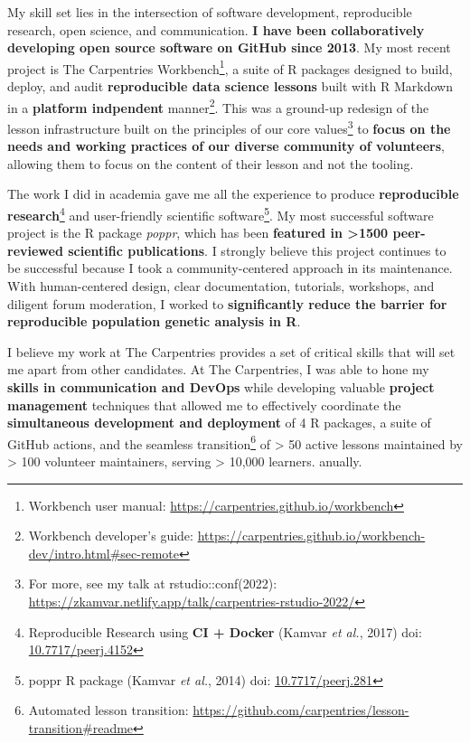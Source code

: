 My skill set lies in the intersection of software development, reproducible
research, open science, and communication. 
\textbf{I have been collaboratively developing open source software on GitHub
since 2013}.
My most recent project is The Carpentries Workbench\footnote{Workbench user manual: \url{https://carpentries.github.io/workbench}}, 
a suite of R packages designed to build, deploy, and audit \textbf{reproducible
data science lessons} built with R Markdown in a \textbf{platform indpendent} manner\footnote{Workbench developer's guide: \url{https://carpentries.github.io/workbench-dev/intro.html\#sec-remote}}.
This was a ground-up redesign of the lesson infrastructure built on the principles
of our core values\footnote{For more, see my talk at rstudio::conf(2022): \url{https://zkamvar.netlify.app/talk/carpentries-rstudio-2022/}}
to \textbf{focus on the needs and working practices of our diverse community of
volunteers}, allowing them to focus on the content of their lesson and not the
tooling.

\vspace{2ex}

The work I did in academia gave me all the experience to produce 
\textbf{reproducible research}\footnote{Reproducible Research using \textbf{CI + Docker} (Kamvar \textit{et al.}, 2017) doi: \href{https://doi.org/10.7717/peerj.4152}{10.7717/peerj.4152}}
and user-friendly scientific software\footnote{poppr R package (Kamvar \textit{et al.}, 2014) doi: \href{https://doi.org/10.7717/peerj.281}{10.7717/peerj.281}}.
My most successful software project is the R package
\textit{poppr}, which has been \textbf{featured in \textgreater1500
peer-reviewed scientific publications}. I strongly believe this project
continues to be successful because I took a community-centered approach in its
maintenance. With human-centered design, clear documentation, tutorials,
workshops, and diligent forum moderation, I worked to \textbf{significantly
reduce the barrier for reproducible population genetic analysis in R}.

\vspace{2ex}

I believe my
work at The Carpentries provides a set of critical skills that will set me
apart from other candidates. At The Carpentries, I was able to hone my
\textbf{skills in communication and DevOps} while developing valuable
\textbf{project management} techniques that allowed me to effectively
coordinate the \textbf{simultaneous development and deployment} of 4 R
packages, a suite of GitHub actions, and the seamless transition\footnote{Automated lesson transition: \url{https://github.com/carpentries/lesson-transition\#readme}}
of > 50 active lessons maintained by > 100 volunteer maintainers, serving >
10,000 learners. anually. 

